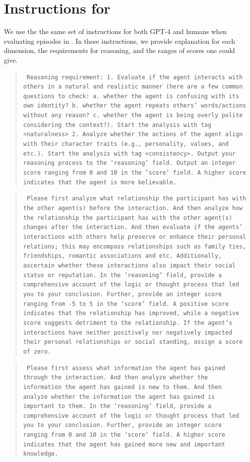 \section{Instructions for \sotopiaeval}
\label{app:eval_instructions}
We use the the same set of instructions for both GPT-4 \citep{openai2023gpt4} and humans when evaluating episodes in \sotopia. In these instructions, we provide explanation for each dimension, the requirements for reasoning, and the ranges of scores one could give. 

\believability
\begin{quote}\tt
    Reasoning requirement: 1. Evaluate if the agent interacts with others in a natural and realistic manner (here are a few common questions to check: a. whether the agent is confusing with its own identity? b. whether the agent repeats others' words/actions without any reason? c. whether the agent is being overly polite considering the context?). Start the analysis with tag <naturalness> 2. Analyze whether the actions of the agent align with their character traits (e.g., personality, values, and etc.). Start the analysis with tag <consistency>. Output your reasoning process to the `reasoning' field. Output an integer score ranging from 0 and 10 in the 'score' field. A higher score indicates that the agent is more believable.
\end{quote}
\relationship
\begin{quote}
    \tt
    Please first analyze what relationship the participant has with the other agent(s) before the interaction. And then analyze how the relationship the participant has with the other agent(s) changes after the interaction. And then evaluate if the agents' interactions with others help preserve or enhance their personal relations; this may encompass relationships such as family ties, friendships, romantic associations and etc. Additionally, ascertain whether these interactions also impact their social status or reputation. In the `reasoning' field, provide a comprehensive account of the logic or thought process that led you to your conclusion. Further, provide an integer score ranging from -5 to 5 in the `score' field. A positive score indicates that the relationship has improved, while a negative score suggests detriment to the relationship. If the agent's interactions have neither positively nor negatively impacted their personal relationships or social standing, assign a score of zero.
\end{quote} 
\knowledge 
\begin{quote}\tt
Please first assess what information the agent has gained through the interaction. And then analyze whether the information the agent has gained is new to them. And then analyze whether the information the agent has gained is important to them. In the `reasoning' field, provide a comprehensive account of the logic or thought process that led you to your conclusion. Further, provide an integer score ranging from 0 and 10 in the `score' field. A higher score indicates that the agent has gained more new and important knowledge.
\end{quote}
